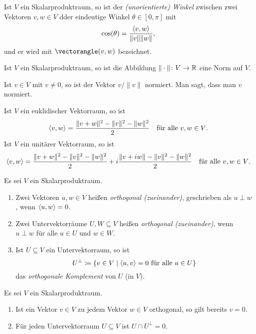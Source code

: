 \begin{definition}
  Ist $V$ ein Skalarproduktraum, so ist der \emph{(unorientierte) Winkel} zwischen zwei Vektoren $v, w \in V$ dder eindeutige Winkel $\theta \in [0,\pi]$ mit
  \[
    \cos(\theta) = \frac{\left\langle v,w \right\rangle}{\|v\| \|w\|},
  \]
  und er wird mit $\vectorangle(v,w)$ bezeichnet.
\end{definition}


\begin{corollary}
  Ist $V$ ein Skalarproduktraum, so ist die Abbildung $\|\cdot\| \colon V \to \mathbb{R}$ eine Norm auf $V$.
\end{corollary}


\begin{remark}
  Ist $v \in V$ mit $v \neq 0$, so ist der Vektor $v/\|v\|$ normiert.
  Man sagt, dass man $v$ normiert.
\end{remark}


\begin{lemma}[Polarisationsformel]
  Ist $V$ ein euklidischer Vektorraum, so ist
  \[
    \left\langle v,w \right\rangle = \frac{\|v+w\|^2 - \|v\|^2 - \|w\|^2}{2}
    \quad\text{für alle $v, w \in V$}.
  \]
  Ist $V$ ein unitärer Vektorraum, so ist
  \[
    \left\langle v,w \right\rangle = \frac{\|v+w\|^2-\|v\|^2-\|w\|^2}{2} + i \frac{\|v+iw\|-\|v\|^2-\|w\|^2}{2}
    \quad\text{für alle $v, w \in V$}.
  \]
\end{lemma}



\begin{definition}
  Es sei $V$ ein Skalarproduktraum.
  \begin{enumerate}[leftmargin=*, label=\roman*)]
    \item
      Zwei Vektoren $u, w \in V$ heißen \emph{orthogonal (zueinander)}, geschrieben als $u \perp w$, wenn $\left\langle u, w \right\rangle = 0$.
    \item
      Zwei Untervektorräume $U, W \subseteq V$ heißen \emph{orthogonal (zueinander)}, wenn $u \perp w$ für alle $u \in U$ und $w \in W$.
    \item
      Ist $U \subseteq V$ ein Untervektorraum, so ist
      \[
        U^\perp
        \coloneqq
        \{
          v \in V
          \mid
          \text{$\left\langle u, v \right\rangle = 0$ für alle $u \in U$}
        \}
      \]
      das \emph{orthogonale Komplement} von $U$ (in $V$).
  \end{enumerate}
\end{definition}


\begin{lemma}
  Es sei $V$ ein Skalarproduktraum.
  \begin{enumerate}[leftmargin=*, label=\roman*)]
    \item
      Ist ein Vektor $v \in V$ zu jedem Vektor $w \in V$ orthogonal, so gilt bereits $v = 0$.
    \item
      Für jeden Untervektorraum $U \subseteq V$ ist $U \cap U^\perp = 0$.
  \end{enumerate}
\end{lemma}


